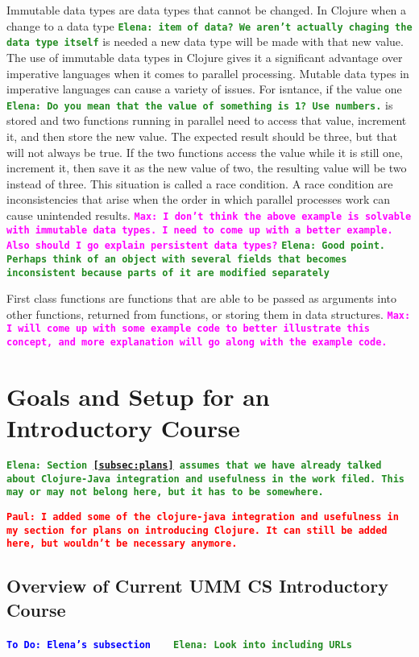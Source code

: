 \documentclass[12pt]{article}
\newcommand{\comment}[1]{{\bf \tt  {#1}}}
\newcommand{\emcomment}[1]{\textcolor{ForestGreen}{\comment{Elena: {#1}}}}
\newcommand{\todo}[1]{\textcolor{blue}{\comment{To Do: {#1}}}}
\newcommand{\pscomment}[1]{\textcolor{red}{\comment{Paul: {#1}}}}
\newcommand{\mmcomment}[1]{\textcolor{magenta}{\comment{Max: {#1}}}}
\begin{document}
Immutable data types are data types that cannot be changed. In Clojure when a change to a data type \emcomment{item of data? We aren't actually chaging the data type itself} is needed a new data type will be made with that new value. The use of immutable data types in Clojure gives it a significant advantage over imperative languages when it comes to parallel processing. Mutable data types in imperative languages can cause a variety of issues. For isntance, if the value one \emcomment{Do you mean that the value of something is 1? Use numbers.} is stored and two functions running in parallel need to access that value, increment it, and then store the new value. The expected result should be three, but that will not always be true. If the two functions access the value while it is still one, increment it, then save it as the new value of two, the resulting value will be two instead of three. This situation is called a race condition. A race condition are inconsistencies that arise when the order in which parallel processes work can cause unintended results.
\mmcomment{I don't think the above example is solvable with immutable data types. I need to come up with a better example. Also should I go explain persistent data types?}
\emcomment{Good point. Perhaps think of an object with several fields that becomes inconsistent because parts of it are modified separately}

First class functions are functions that are able to be passed as arguments into other functions, returned from functions, or storing them in data structures.
\mmcomment{I will come up with some example code to better illustrate this concept, and more explanation will go along with the example code.}   

\section{Goals and Setup for an Introductory Course}\label{sec:racket-clojure}
\emcomment{Section~\ref{subsec:plans} assumes that we have already talked about Clojure-Java integration and usefulness in the work filed. This may or may not belong here, but it has to be somewhere.}

\pscomment{I added some of the clojure-java integration and usefulness in my section for plans on introducing Clojure.  It can still be added here, but wouldn't be necessary anymore.}

\subsection{Overview of Current UMM CS Introductory Course}\label{subsec:course}
\todo{Elena's subsection}
~\cite{htdp}
~\cite{lein} \emcomment{Look into including URLs}
\end{document}

